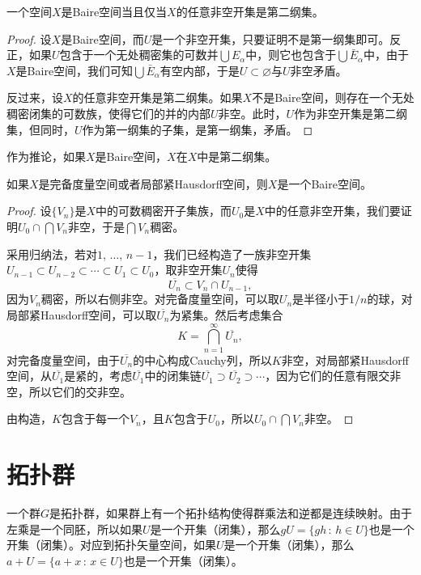 \begin{lem}
	一个空间$X$是Baire空间当且仅当$X$的任意非空开集是第二纲集。
\end{lem}

\begin{proof}
	设$X$是Baire空间，而$U$是一个非空开集，只要证明不是第一纲集即可。反正，如果$U$包含于一个无处稠密集的可数并$\bigcup E_\alpha$中，则它也包含于$\bigcup \bar{E}_\alpha$中，由于$X$是Baire空间，我们可知$\bigcup \bar{E}_\alpha$有空内部，于是$U\subset \varnothing$与$U$非空矛盾。

	反过来，设$X$的任意非空开集是第二纲集。如果$X$不是Baire空间，则存在一个无处稠密闭集的可数族，使得它们的并的内部$U$非空。此时，$U$作为非空开集是第二纲集，但同时，$U$作为第一纲集的子集，是第一纲集，矛盾。
\end{proof}

作为推论，如果$X$是Baire空间，$X$在$X$中是第二纲集。

\begin{thm}[Baire纲定理]
	如果$X$是完备度量空间或者局部紧Hausdorff空间，则$X$是一个Baire空间。
\end{thm}

\begin{proof}
	设$\{V_n\}$是$X$中的可数稠密开子集族，而$U_0$是$X$中的任意非空开集，我们要证明$U_0\cap \bigcap V_n$非空，于是$\bigcap V_n$稠密。

	采用归纳法，若对$1$, $\dots$, $n-1$，我们已经构造了一族非空开集$U_{n-1}\subset U_{n-2}\subset \cdots \subset U_1\subset U_0$，取非空开集$U_n$使得
	\[
	\overline {U_n}\subset V_n\cap U_{n-1},
	\]
	因为$V_n$稠密，所以右侧非空。对完备度量空间，可以取$U_n$是半径小于$1/n$的球，对局部紧Hausdorff空间，可以取$\overline {U_n}$为紧集。然后考虑集合
	\[
	K=\bigcap_{n=1}^\infty \overline {U_n},
	\]
	对完备度量空间，由于$\overline {U_n}$的中心构成Cauchy列，所以$K$非空，对局部紧Hausdorff空间，从$\overline {U_1}$是紧的，考虑$\overline {U_1}$中的闭集链$\overline {U_1}\supset \overline {U_2}\supset \cdots$，因为它们的任意有限交非空，所以它们的交非空。

	由构造，$K$包含于每一个$V_n$，且$K$包含于$U_0$，所以$U_0\cap \bigcap V_n$非空。
\end{proof}

\section{拓扑群}

一个群$G$是拓扑群，如果群上有一个拓扑结构使得群乘法和逆都是连续映射。由于左乘是一个同胚，所以如果$U$是一个开集（闭集），那么$gU=\{gh\,:\,h\in U\}$也是一个开集（闭集）。对应到拓扑矢量空间，如果$U$是一个开集（闭集），那么$a+U=\{a+x\,:\,x\in U\}$也是一个开集（闭集）。

